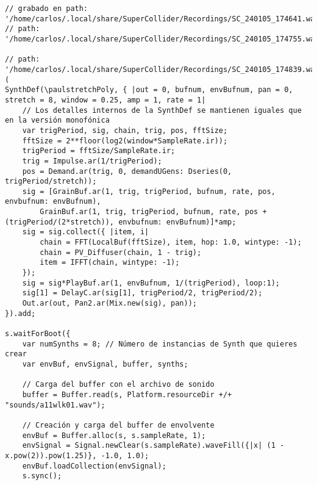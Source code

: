 


















\begin{minipage}[t]{1\textwidth}
    \centering
    \begin{lstlisting}[style=SuperCollider-IDE, basicstyle=\footnotesize\ttfamily, numbers=none]
// grabado en path: '/home/carlos/.local/share/SuperCollider/Recordings/SC_240105_174641.wav'
// path: '/home/carlos/.local/share/SuperCollider/Recordings/SC_240105_174755.wav'

// path: '/home/carlos/.local/share/SuperCollider/Recordings/SC_240105_174839.wav'
(
SynthDef(\paulstretchPoly, { |out = 0, bufnum, envBufnum, pan = 0, stretch = 8, window = 0.25, amp = 1, rate = 1|
    // Los detalles internos de la SynthDef se mantienen iguales que en la versión monofónica
    var trigPeriod, sig, chain, trig, pos, fftSize;
    fftSize = 2**floor(log2(window*SampleRate.ir));
    trigPeriod = fftSize/SampleRate.ir;
    trig = Impulse.ar(1/trigPeriod);
    pos = Demand.ar(trig, 0, demandUGens: Dseries(0, trigPeriod/stretch));
    sig = [GrainBuf.ar(1, trig, trigPeriod, bufnum, rate, pos, envbufnum: envBufnum),
        GrainBuf.ar(1, trig, trigPeriod, bufnum, rate, pos + (trigPeriod/(2*stretch)), envbufnum: envBufnum)]*amp;
    sig = sig.collect({ |item, i|
        chain = FFT(LocalBuf(fftSize), item, hop: 1.0, wintype: -1);
        chain = PV_Diffuser(chain, 1 - trig);
        item = IFFT(chain, wintype: -1);
    });
    sig = sig*PlayBuf.ar(1, envBufnum, 1/(trigPeriod), loop:1);
    sig[1] = DelayC.ar(sig[1], trigPeriod/2, trigPeriod/2);
    Out.ar(out, Pan2.ar(Mix.new(sig), pan));
}).add;

s.waitForBoot({
    var numSynths = 8; // Número de instancias de Synth que quieres crear
    var envBuf, envSignal, buffer, synths;

    // Carga del buffer con el archivo de sonido
    buffer = Buffer.read(s, Platform.resourceDir +/+ "sounds/a11wlk01.wav");

    // Creación y carga del buffer de envolvente
    envBuf = Buffer.alloc(s, s.sampleRate, 1);
    envSignal = Signal.newClear(s.sampleRate).waveFill({|x| (1 - x.pow(2)).pow(1.25)}, -1.0, 1.0);
    envBuf.loadCollection(envSignal);
    s.sync();


\end{lstlisting}
\end{minipage}
